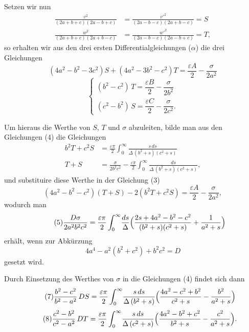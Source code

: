 \documentclass[12pt,a4paper]{book}
\theoremstyle{definition}
\theoremstyle{remark}
\begin{document}
Setzen wir nun
\begin{equation}
\tag{2}
\begin{aligned} \frac{v^2}{(2a+b+c)(2a-b+c)} &= \frac{v'^2}{(2a-b-c)(2a+b-c)} = S\\ \frac{w^2}{(2a+b+c)(2a+b-c)} &= \frac{w'^2}{(2a-b-c)(2a-b+c)} = T, \end{aligned}
\end{equation}
so erhalten wir aus den drei ersten Differentialgleichungen ($\alpha$) die drei Gleichungen
\begin{equation}
\tag{3} (4a^2 - b^2 - 3c^2)S + (4a^2 - 3b^2 - c^2)T = \frac{\varepsilon A}{2} - \frac{\sigma}{2a^2} \end{equation}
\begin{equation}
\tag{4}
\begin{cases} (b^2 - c^2)\,T = \dfrac{\varepsilon B}{2} - \dfrac{\sigma}{2b^2}\\[1ex] (c^2 - b^2)\,S = \dfrac{\varepsilon C}{2} - \dfrac{\sigma}{2c^2}. \end{cases}
\end{equation}

Um hieraus die Werthe von $S$, $T$ und $\sigma$ abzuleiten, bilde man aus den Gleichungen (4) die Gleichungen
\begin{align*} b^2T + c^2S &= \frac{\varepsilon\pi}{2}\int_0^{\infty}\!\frac{s\,ds}{\Delta\,(b^2+s)(c^2+s)}\\ T + S &= \frac{\sigma}{2b^2c^2} - \frac{\varepsilon\pi}{2}\int_0^{\infty}\!\frac{ds}{\Delta\,(b^2+s)(c^2+s)}, \end{align*}
und substituire diese Werthe in der Gleichung (3)
\[
(4a^2 - b^2 - c^2)(T+S) - 2(b^2T + c^2S) = \frac{\varepsilon A}{2} - \frac{\sigma}{2a^2},
\]
wodurch man
\begin{equation}
\tag{5} \frac{D\sigma}{2a^2b^2c^2} = \frac{\varepsilon\pi}{2}\int_0^{\infty}\!\frac{ds}{\Delta}\Bigl(\frac{2s + 4a^2 - b^2 - c^2}{(b^2+s)(c^2+s)} + \frac{1}{a^2+s}\Bigr) \end{equation}
erhält, wenn zur Abkürzung
\begin{equation}
\tag{6} 4a^4 - a^2(b^2 + c^2) + b^2c^2 = D \end{equation}
gesetzt wird.

Durch Einsetzung des Werthes von $\sigma$ in die Gleichungen (4) findet sich dann
\begin{equation}
\tag{7} \frac{b^2 - c^2}{b^2 - a^2}\,DS = \frac{\varepsilon\pi}{2}\int_0^{\infty}\!\frac{s\,ds}{\Delta\,(b^2+s)}\Bigl(\frac{4a^2 - c^2 + b^2}{c^2+s} - \frac{b^2}{a^2+s}\Bigr) \end{equation}
\begin{equation}
\tag{8} \frac{c^2 - b^2}{c^2 - a^2}\,DT = \frac{\varepsilon\pi}{2}\int_0^{\infty}\!\frac{s\,ds}{\Delta\,(c^2+s)}\Bigl(\frac{4a^2 - b^2 + c^2}{b^2+s} - \frac{c^2}{a^2+s}\Bigr). \end{equation}
\end{document}
